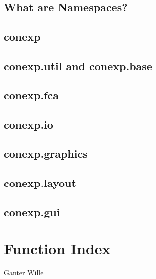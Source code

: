 \documentclass{scrbook}
\theoremstyle{plain}
\theoremstyle{plain}
\theoremstyle{plain}
\theoremstyle{nonumberplain}
\begin{document}
\section{What are Namespaces?}

\section{conexp}

\section{conexp.util and conexp.base}

\section{conexp.fca}

\section{conexp.io}

\section{conexp.graphics}

\section{conexp.layout}

\section{conexp.gui}


\chapter{Function Index}


\appendix

\begin{thebibliography}{xxxxxxx}
 Ganter Wille
\end{thebibliography}
\end{document}

